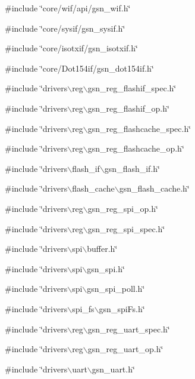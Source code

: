 {\ttfamily \#include \char`\"{}core/wif/api/gsn\_\-wif.h\char`\"{}}\par
{\ttfamily \#include \char`\"{}core/sysif/gsn\_\-sysif.h\char`\"{}}\par
{\ttfamily \#include \char`\"{}core/isotxif/gsn\_\-isotxif.h\char`\"{}}\par
{\ttfamily \#include \char`\"{}core/Dot154if/gsn\_\-dot154if.h\char`\"{}}\par
{\ttfamily \#include \char`\"{}drivers$\backslash$reg$\backslash$gsn\_\-reg\_\-flashif\_\-spec.h\char`\"{}}\par
{\ttfamily \#include \char`\"{}drivers$\backslash$reg$\backslash$gsn\_\-reg\_\-flashif\_\-op.h\char`\"{}}\par
{\ttfamily \#include \char`\"{}drivers$\backslash$reg$\backslash$gsn\_\-reg\_\-flashcache\_\-spec.h\char`\"{}}\par
{\ttfamily \#include \char`\"{}drivers$\backslash$reg$\backslash$gsn\_\-reg\_\-flashcache\_\-op.h\char`\"{}}\par
{\ttfamily \#include \char`\"{}drivers$\backslash$flash\_\-if$\backslash$gsn\_\-flash\_\-if.h\char`\"{}}\par
{\ttfamily \#include \char`\"{}drivers$\backslash$flash\_\-cache$\backslash$gsn\_\-flash\_\-cache.h\char`\"{}}\par
{\ttfamily \#include \char`\"{}drivers$\backslash$reg$\backslash$gsn\_\-reg\_\-spi\_\-op.h\char`\"{}}\par
{\ttfamily \#include \char`\"{}drivers$\backslash$reg$\backslash$gsn\_\-reg\_\-spi\_\-spec.h\char`\"{}}\par
{\ttfamily \#include \char`\"{}drivers$\backslash$spi$\backslash$buffer.h\char`\"{}}\par
{\ttfamily \#include \char`\"{}drivers$\backslash$spi$\backslash$gsn\_\-spi.h\char`\"{}}\par
{\ttfamily \#include \char`\"{}drivers$\backslash$spi$\backslash$gsn\_\-spi\_\-poll.h\char`\"{}}\par
{\ttfamily \#include \char`\"{}drivers$\backslash$spi\_\-fs$\backslash$gsn\_\-spiFs.h\char`\"{}}\par
{\ttfamily \#include \char`\"{}drivers$\backslash$reg$\backslash$gsn\_\-reg\_\-uart\_\-spec.h\char`\"{}}\par
{\ttfamily \#include \char`\"{}drivers$\backslash$reg$\backslash$gsn\_\-reg\_\-uart\_\-op.h\char`\"{}}\par
{\ttfamily \#include \char`\"{}drivers$\backslash$uart$\backslash$gsn\_\-uart.h\char`\"{}}\par
